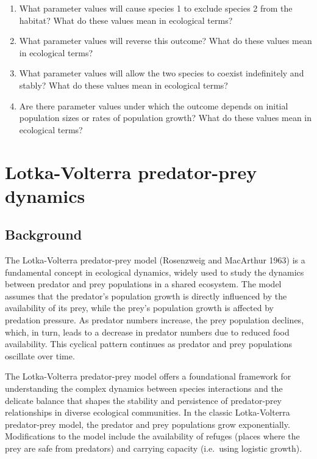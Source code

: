 \documentclass[
  a4paper]{book}
\providecommand{\tightlist}{%
  \setlength{\itemsep}{0pt}\setlength{\parskip}{0pt}}
\begin{document}
\begin{enumerate}
\def\labelenumi{\arabic{enumi}.}
\tightlist
\item
  What parameter values will cause species 1 to exclude species 2 from the habitat? What do these values mean in ecological terms?
\item
  What parameter values will reverse this outcome? What do these values mean in ecological terms?
\item
  What parameter values will allow the two species to coexist indefinitely and stably? What do these values mean in ecological terms?
\item
  Are there parameter values under which the outcome depends on initial population sizes or rates of population growth? What do these values mean in ecological terms?
\end{enumerate}

\hypertarget{lotka-volterra-predator-prey-dynamics}{%
\chapter{Lotka-Volterra predator-prey dynamics}\label{lotka-volterra-predator-prey-dynamics}}

\hypertarget{background-13}{%
\section{Background}\label{background-13}}

The Lotka-Volterra predator-prey model (Rosenzweig and MacArthur 1963) is a fundamental concept in ecological dynamics, widely used to study the dynamics between predator and prey populations in a shared ecosystem. The model assumes that the predator's population growth is directly influenced by the availability of its prey, while the prey's population growth is affected by predation pressure. As predator numbers increase, the prey population declines, which, in turn, leads to a decrease in predator numbers due to reduced food availability. This cyclical pattern continues as predator and prey populations oscillate over time.

The Lotka-Volterra predator-prey model offers a foundational framework for understanding the complex dynamics between species interactions and the delicate balance that shapes the stability and persistence of predator-prey relationships in diverse ecological communities. In the classic Lotka-Volterra predator-prey model, the predator and prey populations grow exponentially. Modifications to the model include the availability of refuges (places where the prey are safe from predators) and carrying capacity (i.e.~using logistic growth).
\end{document}
